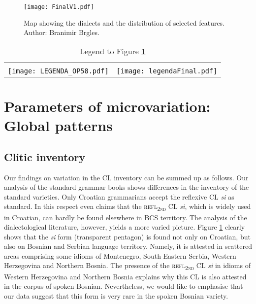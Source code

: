 \begin{figure}
\caption{Map showing the dialects and the distribution of selected features. Author: Branimir Brgles.}
\label{M10.1}
\texttt{[image: FinalV1.pdf]}
\end{figure}

\begin{table}
\caption{Legend to Figure \ref{M10.1}}
\label{T10.1}
\begin{tabular}{|l|l|}
\hline
&\\ %
\texttt{[image: LEGENDA\_OP58.pdf]}
&
\texttt{[image: legendaFinal.pdf]} %
\\\hline
\end{tabular}
\end{table}


\section{Parameters of microvariation: Global patterns}
\subsection{Clitic inventory}
\label{sec:10.2.1}

Our findings on variation in the CL inventory can be summed up as follows. Our analysis of the standard grammar books shows differences in the inventory of the standard varieties. Only Croatian grammarians accept the reflexive CL \textit{si} as standard. In this respect \citet[440]{Ridjanovic12} even claims that the \textsc{refl\textsubscript{2nd}} CL \textit{si}, which is widely used in Croatian, can hardly be found elsewhere in BCS territory. The analysis of the dialectological literature, however, yields a more varied picture. Figure \ref{M10.1} clearly shows that the \textit{si }form (transparent pentagon) is found not only on Croatian, but also on Bosnian and Serbian language territory. Namely, it is attested in scattered areas comprising some idioms of Montenegro, South Eastern Serbia, Western Herzegovina and Northern Bosnia. The presence of the \textsc{refl\textsubscript{2nd}} CL \textit{si} in idioms of Western Herzegovina and Northern Bosnia explains why this CL is also attested in the corpus of spoken Bosnian. Nevertheless, we would like to emphasise that our data suggest that this form is very rare in the spoken Bosnian variety. 

